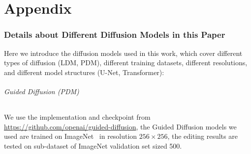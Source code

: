 \appendix
\newpage
\part*{\Huge Appendix}









\section{Details about Different Diffusion Models in this Paper}

Here we introduce the diffusion models used in this work, which cover different types of diffusion (LDM, PDM), different training datasets, different resolutions, and different model structures (U-Net, Transformer):

\paragraph{Guided Diffusion (PDM)} We use the implementation and checkpoint from \url{https://github.com/openai/guided-diffusion}, the Guided Diffusion models we used are trained on ImageNet~\cite{deng2009imagenet} in resolution $256\times 256$, the editing results are tested on sub-dataset of ImageNet validation set sized 500.

